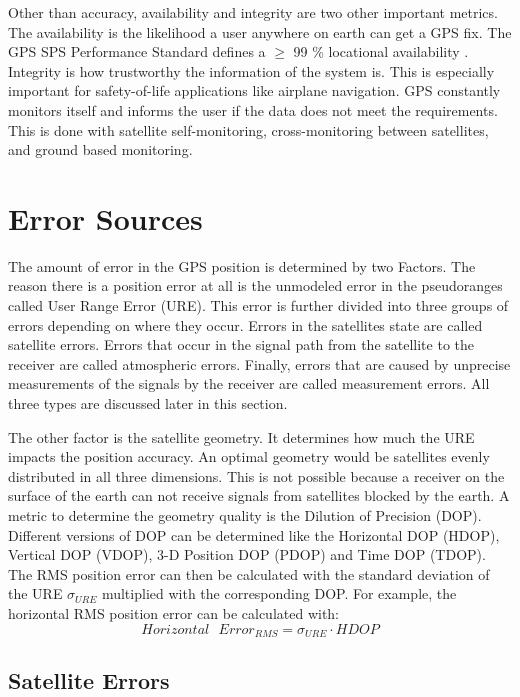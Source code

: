 Other than accuracy, availability and integrity are two other important metrics.
The availability is the likelihood a user anywhere on earth can get a GPS fix.
The GPS SPS Performance Standard defines a $\geq$ 99 \% locational availability \cite{SPS_Performance}.
Integrity is how trustworthy the information of the system is.
This is especially important for safety-of-life applications like airplane navigation.
GPS constantly monitors itself and informs the user if the data does not meet the requirements.
This is done with satellite self-monitoring, cross-monitoring between satellites, and ground based monitoring. \cite{misra2011global}


\section{Error Sources}\label{sec:error_sources}

The amount of error in the GPS position is determined by two Factors.
The reason there is a position error at all is the unmodeled error in the pseudoranges called User Range Error (URE).
This error is further divided into three groups of errors depending on where they occur.
Errors in the satellites state are called satellite errors.
Errors that occur in the signal path from the satellite to the receiver are called atmospheric errors.
Finally, errors that are caused by unprecise measurements of the signals by the receiver are called measurement errors.
All three types are discussed later in this section.

The other factor is the satellite geometry.
It determines how much the URE impacts the position accuracy.
An optimal geometry would be satellites evenly distributed in all three dimensions.
This is not possible because a receiver on the surface of the earth can not receive signals from satellites blocked by the earth.
A metric to determine the geometry quality is the Dilution of Precision (DOP).
Different versions of DOP can be determined like the Horizontal DOP (HDOP), Vertical DOP (VDOP), 3-D Position DOP (PDOP) and Time DOP (TDOP).
The RMS position error can then be calculated with the standard deviation of the URE $\sigma_{URE}$ multiplied with the corresponding DOP.
For example, the horizontal RMS position error can be calculated with:
\begin{equation}
 Horizontal \text{ } Error_{RMS} = \sigma_{URE} \cdot HDOP
\end{equation}

\subsection{Satellite Errors}

